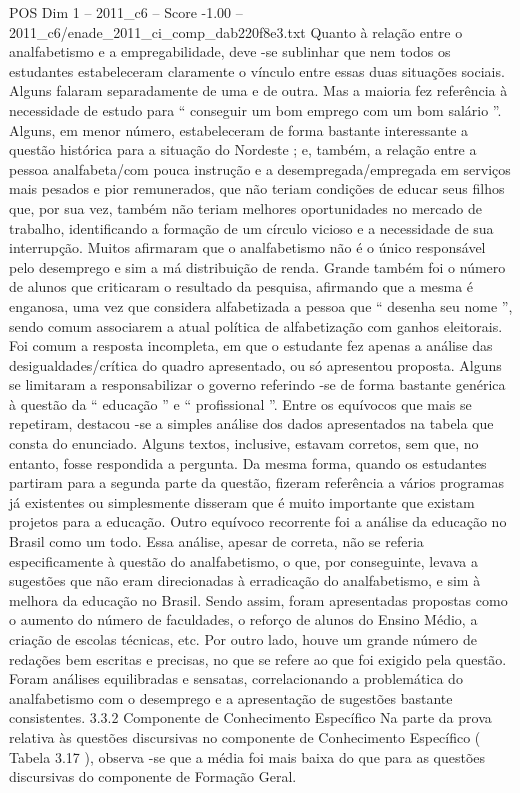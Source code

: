 \begin{textsample}{POS Dim 1 – 2011\_c6 – Score -1.00 – 2011\_c6/enade\_2011\_ci\_comp\_dab220f8e3.txt}
Quanto à relação entre o analfabetismo e a empregabilidade, deve -se sublinhar que nem todos os estudantes estabeleceram claramente o vínculo entre essas duas situações sociais.
Alguns falaram separadamente de uma e de outra.
Mas a maioria fez referência à necessidade de estudo para “ conseguir um bom emprego com um bom salário ”.
Alguns, em menor número, estabeleceram de forma bastante interessante a questão histórica para a situação do Nordeste ; e, também, a relação entre a pessoa analfabeta/com pouca instrução e a desempregada/empregada em serviços mais pesados e pior remunerados, que não teriam condições de educar seus filhos que, por sua vez, também não teriam melhores oportunidades no mercado de trabalho, identificando a formação de um círculo vicioso e a necessidade de sua interrupção.
Muitos afirmaram que o analfabetismo não é o único responsável pelo desemprego e sim a má distribuição de renda.
Grande também foi o número de alunos que criticaram o resultado da pesquisa, afirmando que a mesma é enganosa, uma vez que considera alfabetizada a pessoa que “ desenha seu nome ”, sendo comum associarem a atual política de alfabetização com ganhos eleitorais.
Foi comum a resposta incompleta, em que o estudante fez apenas a análise das desigualdades/crítica do quadro apresentado, ou só apresentou proposta.
Alguns se limitaram a responsabilizar o governo referindo -se de forma bastante genérica à questão da “ educação ” e “ profissional ”.
Entre os equívocos que mais se repetiram, destacou -se a simples análise dos dados apresentados na tabela que consta do enunciado.
Alguns textos, inclusive, estavam corretos, sem que, no entanto, fosse respondida a pergunta.
Da mesma forma, quando os estudantes partiram para a segunda parte da questão, fizeram referência a vários programas já existentes ou simplesmente disseram que é muito importante que existam projetos para a educação.
Outro equívoco recorrente foi a análise da educação no Brasil como um todo.
Essa análise, apesar de correta, não se referia especificamente à questão do analfabetismo, o que, por conseguinte, levava a sugestões que não eram direcionadas à erradicação do analfabetismo, e sim à melhora da educação no Brasil.
Sendo assim, foram apresentadas propostas como o aumento do número de faculdades, o reforço de alunos do Ensino Médio, a criação de escolas técnicas, etc.
Por outro lado, houve um grande número de redações bem escritas e precisas, no que se refere ao que foi exigido pela questão.
Foram análises equilibradas e sensatas, correlacionando a problemática do analfabetismo com o desemprego e a apresentação de sugestões bastante consistentes. 3.3.2 Componente de Conhecimento Específico Na parte da prova relativa às questões discursivas no componente de Conhecimento Específico ( Tabela 3.17 ), observa -se que a média foi mais baixa do que para as questões discursivas do componente de Formação Geral.

\end{textsample}
